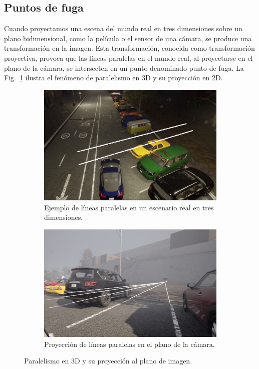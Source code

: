 \subsection{Puntos de fuga}\label{sec:vanishing-points}

Cuando proyectamos una escena del mundo real en tres dimensiones sobre un plano bidimensional,
como la película o el sensor de una cámara, se produce una transformación en la imagen.
Esta transformación, conocida como transformación proyectiva, provoca que las líneas paralelas en el mundo real,
al proyectarse en el plano de la cámara, se intersecten en un punto denominado punto de fuga.
La Fig.~\ref{fig:distorion-teo} ilustra el fenómeno de paralelismo en 3D y su proyección en 2D.

\begin{figure}[!ht]
	\centering
	\begin{subfigure}{0.4\textwidth}
		\includegraphics[width=\textwidth]{img/reticule/paralel_lines}
		\caption{Ejemplo de líneas paralelas en un escenario real en tres dimensiones.}
	\end{subfigure}
	\begin{subfigure}{0.4\textwidth}
		\includegraphics[width=\textwidth]{img/reticule/pov}
		\caption{Proyección de líneas paralelas en el plano de la cámara.}
	\end{subfigure}
	\caption{Paralelismo en 3D y su proyección al plano de imagen.}
	\label{fig:distorion-teo}
\end{figure}


